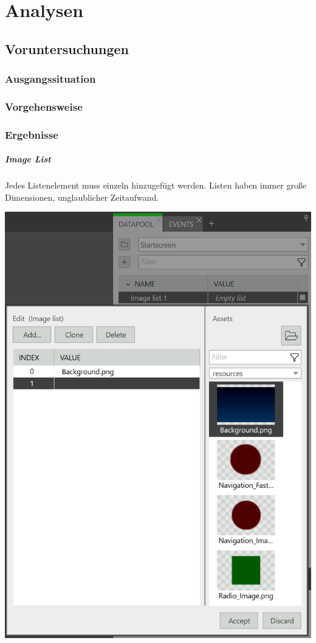 \chapter{Analysen}\label{ch:method}

\section {Voruntersuchungen}
\subsection{Ausgangssituation}
\subsection{Vorgehensweise}
\subsection{Ergebnisse}

\paragraph{Image List}
Jedes Listenelement muss einzeln hinzugefügt werden. Listen haben immer große Dimensionen, unglaublicher Zeitaufwand.

\begin{center}
  \includegraphics[scale=0.5]{figures/ImageList.png}
  \label{fig:ImageList}
\end{center}


